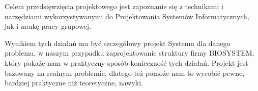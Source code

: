 

Celem przedsięwzięcia projektowego jest zapoznanie się z technikami i narzędziami wykorzystywanymi do Projektowania Systemów Informatycznych, jak i naukę pracy grupowej.

Wynikiem tych działań ma być szczegółowy projekt Systemu dla danego problemu, w naszym przypadku zaprojektowanie struktury firmy BIOSYSTEM, który pokaże nam w praktyczny sposób konieczność tych działań. Projekt jest bazowany na realnym problemie, dlatego też pomoże nam to wyrobić pewne, bardziej praktyczne niż teoretyczne, nawyki.
